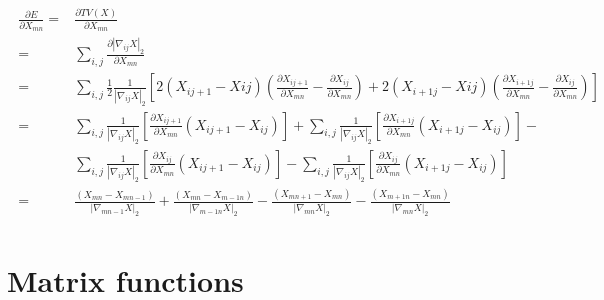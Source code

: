 \documentclass[a4paper]{article}
\begin{document}
\begin{align}
\begin{split}
\frac{\partial{E}}{\partial{X_{mn}}} = & \frac{\partial{TV(X)}}{\partial{X_{mn}}} \\
 = & \sum_{i,j} \frac{\partial \left | \nabla_{ij} X \right |_2}{\partial X_{mn}}\\
 = & \sum_{i,j} \frac{1}{2}\frac{1}{ \left | \nabla_{ij} X \right |_2}\left [ 2(X_{ij+1}-X{ij})(\frac{\partial X_{ij+1}}{\partial X_{mn}} - \frac{\partial X_{ij}}{\partial X_{mn}}) + 2(X_{i+1j}-X{ij})(\frac{\partial X_{i+1j}}{\partial X_{mn}} - \frac{\partial X_{ij}}{\partial X_{mn}}) \right ] \\
  = & 
  \sum_{i,j}  \frac{1}{ \left | \nabla_{ij} X \right |_2}
  \left [ \frac{\partial X_{ij+1}}{\partial X_{mn}}\left ( X_{ij+1}-X_{ij} \right )\right] + 
  \sum_{i,j}  \frac{1}{ \left | \nabla_{ij} X \right |_2} 
  \left [\frac{\partial X_{i+1j}}{\partial X_{mn}} \left (X_{i+1j}-X_{ij} \right ) \right] -\\
   & \sum_{i,j}  \frac{1}{ \left | \nabla_{ij} X \right |_2}
   \left [ \frac{\partial X_{ij}}{\partial X_{mn}} \left ( X_{ij+1}-X_{ij}\right ) \right] - 
   \sum_{i,j}  \frac{1}{ \left | \nabla_{ij} X \right |_2}
   \left [ \frac{\partial X_{ij}}{\partial X_{mn}} \left ( X_{i+1j}-X_{ij}\right ) \right]\\
  = & \frac{\left (X_{mn}-X_{mn-1} \right )}{\left | \nabla_{mn-1} X \right |_2} + 
      \frac{\left (X_{mn}-X_{m-1n} \right )}{\left | \nabla_{m-1n} X \right |_2} -
     \frac{\left (X_{mn+1}-X_{mn} \right )}{\left | \nabla_{mn} X \right |_2} -
      \frac{\left (X_{m+1n}-X_{mn} \right )}{\left | \nabla_{mn} X \right |_2} 
\end{split}
\end{align}

\newpage
\section{Matrix functions}
\end{document}
